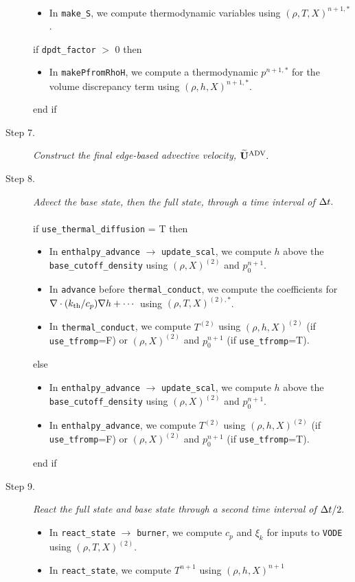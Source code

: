 \begin{description}
\begin{itemize}
\item In {\tt make\_S}, we compute thermodynamic variables using $(\rho,T,X)^{n+1,*}$.
\end{itemize}
if {\tt dpdt\_factor} $>$ 0 then
\begin{itemize}
\item In {\tt makePfromRhoH}, we compute a thermodynamic $p^{n+1,*}$ for the volume 
discrepancy term using $(\rho,h,X)^{n+1,*}$.
\end{itemize}
end if
\item[Step 7.] {\em Construct the final edge-based advective velocity, $\widetilde{\mathbf{U}}^{\mathrm{ADV}}.$}
\item[Step 8.] {\em Advect the base state, then the full state, through a time interval 
of $\Delta t.$}\\ \\
if {\tt use\_thermal\_diffusion} = T then
\begin{itemize}
\item In {\tt enthalpy\_advance} $\rightarrow$ {\tt update\_scal}, we compute $h$ above
the {\tt base\_cutoff\_density} using $(\rho,X)^{(2)}$ and $p_0^{n+1}$.
\item In {\tt advance} before {\tt thermal\_conduct}, we compute the coefficients for 
$\nabla\cdot(k_{\rm th}/c_p)\nabla h + \cdots$ using $(\rho,T,X)^{(2),*}$.
\item In {\tt thermal\_conduct}, we compute $T^{(2)}$ using $(\rho,h,X)^{(2)}$
(if {\tt use\_tfromp}=F) or $(\rho,X)^{(2)}$ and $p_0^{n+1}$ (if {\tt use\_tfromp}=T).
\end{itemize}
else
\begin{itemize}
\item In {\tt enthalpy\_advance} $\rightarrow$ {\tt update\_scal}, we compute $h$ above
the {\tt base\_cutoff\_density} using $(\rho,X)^{(2)}$ and $p_0^{n+1}$.
\item In {\tt enthalpy\_advance}, we compute $T^{(2)}$ using $(\rho,h,X)^{(2)}$
(if {\tt use\_tfromp}=F) or $(\rho,X)^{(2)}$ and $p_0^{n+1}$ (if {\tt use\_tfromp}=T).
\end{itemize}
end if
\item[Step 9.] {\em React the full state and base state through a second time interval 
of $\Delta t/2.$}
\begin{itemize}
\item In {\tt react\_state} $\rightarrow$ {\tt burner}, we compute $c_p$ and $\xi_k$ 
for inputs to {\tt VODE} using $(\rho,T,X)^{(2)}$.
\item In {\tt react\_state}, we compute $T^{n+1}$ using $(\rho,h,X)^{n+1}$ 

\end{itemize}
\end{description}
